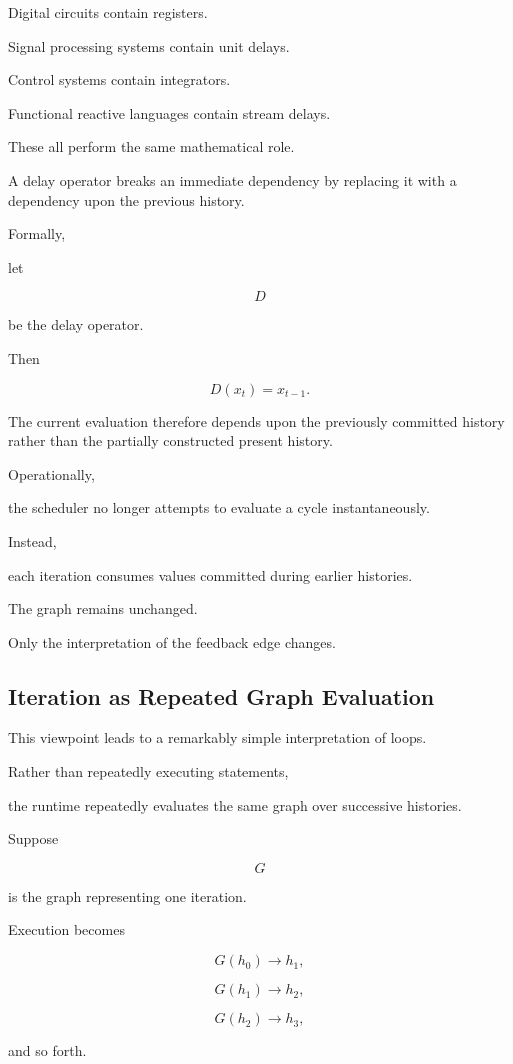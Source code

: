 \documentclass[12pt,oneside]{article}
\begin{document}
Digital circuits contain registers.

Signal processing systems contain unit delays.

Control systems contain integrators.

Functional reactive languages contain stream delays.

These all perform the same mathematical role.

A delay operator breaks an immediate dependency by replacing it with a dependency upon the previous history.

Formally,

let

\[
D
\]

be the delay operator.

Then

\[
D(x_t)=x_{t-1}.
\]

The current evaluation therefore depends upon the previously committed history rather than the partially constructed present history.

Operationally,

the scheduler no longer attempts to evaluate a cycle instantaneously.

Instead,

each iteration consumes values committed during earlier histories.

The graph remains unchanged.

Only the interpretation of the feedback edge changes.

\subsection{Iteration as Repeated Graph Evaluation}

This viewpoint leads to a remarkably simple interpretation of loops.

Rather than repeatedly executing statements,

the runtime repeatedly evaluates the same graph over successive histories.

Suppose

\[
G
\]

is the graph representing one iteration.

Execution becomes

\[
G(h_0)
\rightarrow
h_1,
\]

\[
G(h_1)
\rightarrow
h_2,
\]

\[
G(h_2)
\rightarrow
h_3,
\]

and so forth.
\end{document}

